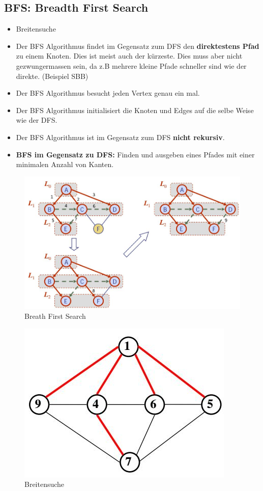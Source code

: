 \subsection{BFS: Breadth First Search}
\begin{itemize}
	\item Breitensuche
	\item Der BFS Algorithmus findet im Gegensatz zum DFS den \textbf{direktestens Pfad} zu einem Knoten. Dies ist meist auch der kürzeste. Dies muss aber nicht gezwungermassen sein, da z.B mehrere kleine Pfade schneller sind wie der direkte. (Beispiel SBB)
	\item Der BFS Algorithmus besucht jeden Vertex genau ein mal.
	\item Der BFS Algorithmus initialisiert die Knoten und Edges auf die selbe Weise wie der DFS. 
	\item Der BFS Algorithmus ist im Gegensatz zum DFS \textbf{nicht rekursiv}.
	\item \textbf{BFS im Gegensatz zu DFS:} Finden und ausgeben eines Pfades mit einer minimalen Anzahl von Kanten.
\end{itemize}
\begin{figure}[h]
\centering
\includegraphics[width=0.7\linewidth]{images/bfs_example1}
\caption{Breath First Search}
\label{fig:bfsexample1}
\end{figure}

\begin{figure}[h!]
	\centering
	\includegraphics[width=0.5\linewidth]{images/breath_first}
	\caption{Breitensuche}
	\label{fig:breathfirst}
\end{figure}


